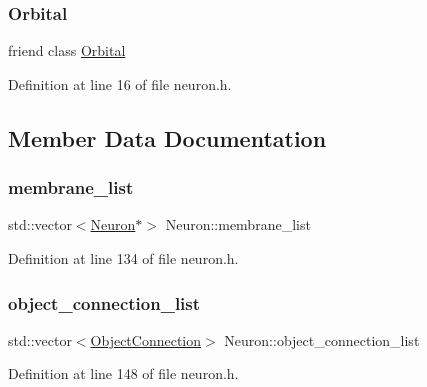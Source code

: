 \subsubsection{\texorpdfstring{Orbital}{Orbital}}
{\footnotesize\ttfamily friend class \mbox{\hyperlink{class_orbital}{Orbital}}\hspace{0.3cm}{\ttfamily [friend]}}



Definition at line 16 of file neuron.\+h.



\subsection{Member Data Documentation}
\mbox{\label{class_neuron_a878a5a42025ba8205adeb9a50b2c1457}} 
\subsubsection{\texorpdfstring{membrane\+\_\+list}{membrane\_list}}
{\footnotesize\ttfamily std\+::vector$<$\mbox{\hyperlink{class_neuron}{Neuron}}$\ast$$>$ Neuron\+::membrane\+\_\+list\hspace{0.3cm}{\ttfamily [protected]}}



Definition at line 134 of file neuron.\+h.

\mbox{\label{class_neuron_a8259952162df5c8bb66eb78126feafe6}} 
\subsubsection{\texorpdfstring{object\+\_\+connection\+\_\+list}{object\_connection\_list}}
{\footnotesize\ttfamily std\+::vector$<$\mbox{\hyperlink{struct_neuron_1_1_object_connection}{Object\+Connection}}$>$ Neuron\+::object\+\_\+connection\+\_\+list\hspace{0.3cm}{\ttfamily [protected]}}



Definition at line 148 of file neuron.\+h.

\mbox{\label{class_neuron_abb3745c6a8727f4ceb8db9e2258b90b5}} 
